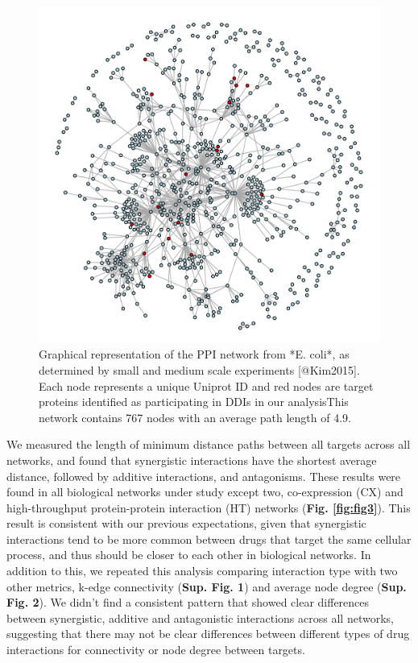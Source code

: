 \documentclass[
]{article}
\begin{document}
\begin{figure}
  \includegraphics[width=1\linewidth]{Fig2} \caption{Graphical representation of the PPI network from *E. coli*, as determined by small and medium scale experiments [@Kim2015]. Each node represents a unique Uniprot ID and red nodes are target proteins identified as participating in DDIs in our analysisThis network contains 767 nodes with an average path length of 4.9.}\label{fig:fig2}
  \end{figure}

We measured the length of minimum distance paths between all targets across all networks, and found that synergistic interactions have the shortest average distance, followed by additive interactions, and antagonisms. These results were found in all biological networks under study except two, co-expression (CX) and high-throughput protein-protein interaction (HT) networks (\textbf{Fig. \ref{fig:fig3}}). This result is consistent with our previous expectations, given that synergistic interactions tend to be more common between drugs that target the same cellular process, and thus should be closer to each other in biological networks. In addition to this, we repeated this analysis comparing interaction type with two other metrics, k-edge connectivity (\textbf{Sup. Fig. 1}) and average node degree (\textbf{Sup. Fig. 2}). We didn't find a consistent pattern that showed clear differences between synergistic, additive and antagonistic interactions across all networks, suggesting that there may not be clear differences between different types of drug interactions for connectivity or node degree between targets.
\end{document}
